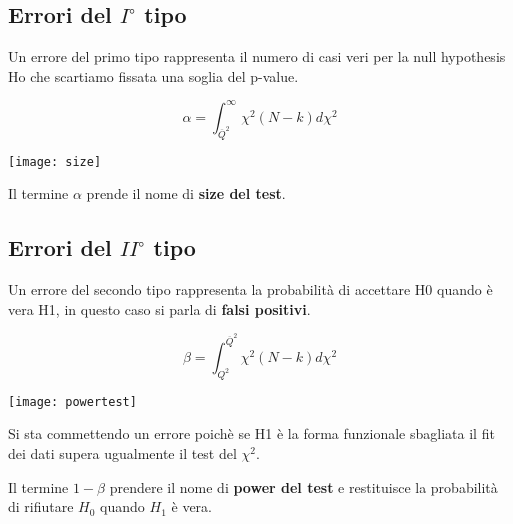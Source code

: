 \documentclass[11pt,a4paper]{book}
\begin{document}
\subsection{Errori del $I^{\circ}$ tipo}

Un errore del primo tipo rappresenta il numero di casi veri per la null hypothesis Ho che scartiamo fissata una soglia del p-value.

\vspace{0.3in}
\begin{minipage}{.4\textwidth}
	\begin{equation}
		\alpha = \int_{\overline{Q}^2}^{\infty}\chi^2(N-k)d\chi^2 
	\end{equation}
  \end{minipage}
  \begin{minipage}{.4\textwidth}
    \centering
    \texttt{[image: size]}	
  \end{minipage}
\vspace{0.2in}

Il termine $\alpha $ prende il nome di \textbf{size del test}. 

\subsection{Errori del $II^{\circ}$ tipo}

 Un errore del secondo tipo rappresenta la probabilit\`{a} di accettare H0 quando \`{e} vera H1, in questo caso si parla di \textbf{falsi positivi}. 
 \vspace{0.2in}
 
\begin{minipage}{.4\textwidth}
	\begin{equation}
		\beta = \int_{Q^2}^{\overline{Q}^2}\chi^2(N-k)d\chi^2 
	\end{equation}
  \end{minipage}
  \begin{minipage}{.4\textwidth}
    \centering
    \texttt{[image: powertest]}	
  \end{minipage}
\vspace{0.2in}

Si sta commettendo un errore poich\`{e} se H1 \`{e} la forma funzionale sbagliata il fit dei dati supera ugualmente il test del $\chi^2$. 

\noindent Il termine $1-\beta$ prendere il nome di \textbf{power del test} e restituisce la probabilit\`{a} di rifiutare $H_0$ quando $H_1$ \`{e} vera.
\newline
\end{document}
